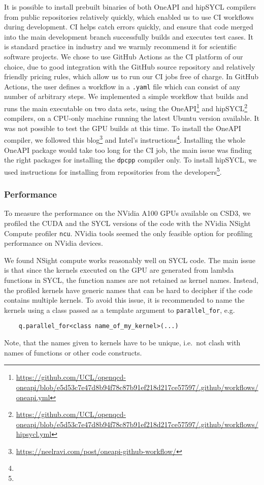\documentclass[../main]{subfiles}
\begin{document}
It is possible to install prebuilt binaries of both OneAPI and hipSYCL compilers from public repositories relatively quickly, which enabled us to use CI workflows during development.
CI helps catch errors quickly, and ensure that code merged into the main development branch successfully builds and executes test cases.
It is standard practice in industry and we warmly recommend it for scientific software projects.
We chose to use GitHub Actions as the CI platform of our choice, due to good integration with the GitHub source repository and relatively friendly pricing rules, which allow us to run our CI jobs free of charge.
In GitHub Actions, the user defines a workflow in a \verb #.yaml# file which can consist of any number of arbitrary steps.
We implemented a simple workflow that builds and runs the main executable on two data sets, using the OneAPI\footnote{\url{https://github.com/UCL/openqcd-oneapi/blob/e5d53c7e47d8b94f78c87b91ef218d217ce57597/.github/workflows/oneapi.yml}} and hipSYCL\footnote{\url{https://github.com/UCL/openqcd-oneapi/blob/e5d53c7e47d8b94f78c87b91ef218d217ce57597/.github/workflows/hipsycl.yml}} compilers, on a CPU-only machine running the latest Ubuntu version available.
It was not possible to test the GPU builds at this time.
To install the OneAPI compiler, we followed this blog\footnote{\url{https://neelravi.com/post/oneapi-github-workflow/}} and Intel's instructions\footnote{\oneapiaptinstall}.
Installing the whole OneAPI package would take too long for the CI job, the main issue was finding the right packages for installing the \verb #dpcpp# compiler only.
To install hipSYCL, we used instructions for installing from repositories from the developers\footnote{\hipsyclinstallfromrepos}.

\subsubsection{Performance}\label{sec:openqcd_performance}

To measure the performance on the NVidia A100 GPUs available on CSD3, we profiled the CUDA and the SYCL versions of the code with the NVidia NSight Compute profiler \texttt{ncu}.
NVidia tools seemed the only feasible option for profiling performance on NVidia devices.

We found NSight compute works reasonably well on SYCL code.
The main issue is that since the kernels executed on the GPU are generated from lambda functions in SYCL, the function names are not retained as kernel names.
Instead, the profiled kernels have generic names that can be hard to decipher if the code contains multiple kernels.
To avoid this issue, it is recommended to name the kernels using a class passed as a template argument to \verb #parallel_for#, e.g.
\begin{verbatim}
    q.parallel_for<class name_of_my_kernel>(...)
\end{verbatim}
Note, that the names given to kernels have to be unique, i.e.\ not clash with names of functions or other code constructs.
\end{document}
